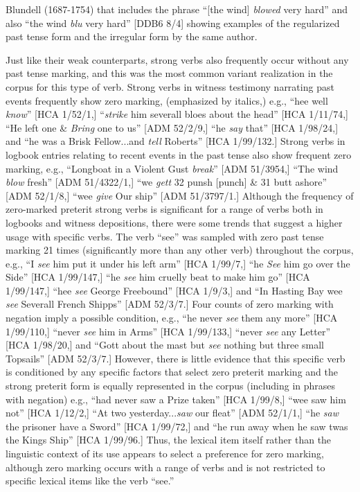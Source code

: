 \documentclass[12pt]{article}
\newenvironment{styleStandard}{\renewcommand\baselinestretch{1.0}\setlength\leftskip{0cm}\setlength\rightskip{0cm plus 1fil}\setlength\parindent{0cm}\setlength\parfillskip{0pt plus 1fil}\setlength\parskip{0in plus 1pt}\writerlistparindent\writerlistleftskip\leavevmode\normalfont\normalsize\writerlistlabel\ignorespaces}{\unskip\vspace{0in plus 1pt}\par}
\newcommand\writerlistleftskip{}
\newcommand\writerlistparindent{}
\newcommand\writerlistlabel{}
\begin{document}
\begin{styleStandard}
Blundell (1687-1754) that includes the phrase “[the wind] \textit{blowed} very hard” and also “the wind \textit{blu} very hard” [DDB6 8/4] showing examples of the regularized past tense form and the irregular form by the same author. 
\end{styleStandard}


\begin{styleStandard}
Just like their weak counterparts, strong verbs also frequently occur without any past tense marking, and this was the most common variant realization in the corpus for this type of verb. Strong verbs in witness testimony narrating past events frequently show zero marking, (emphasized by italics,) e.g., “hee well\textit{ know}” [HCA 1/52/1,] “\textit{strike} him severall bloes about the head” [HCA 1/11/74,] “He left one \&\textit{ Bring} one to us” [ADM 52/2/9,] “he \textit{say} that” [HCA 1/98/24,] and “he was a Brisk Fellow...and\textit{ tell} Roberts” [HCA 1/99/132.] Strong verbs in logbook entries relating to recent events in the past tense also show frequent zero marking, e.g., “Longboat in a Violent Gust \textit{break}” [ADM 51/3954,] “The wind \textit{blow} fresh” [ADM 51/4322/1,] “we \textit{gett} 32 punsh [punch] \& 31 butt ashore” [ADM 52/1/8,] “wee \textit{give} Our ship” [ADM 51/3797/1.] Although the frequency of zero-marked preterit strong verbs is significant for a range of verbs both in logbooks and witness depositions, there were some trends that suggest a higher usage with specific verbs. The verb “see” was sampled with zero past tense marking 21 times (significantly more than any other verb) throughout the corpus, e.g., “I \textit{see} him put it under his left arm” [HCA 1/99/7,] “he \textit{See} him go over the Side” [HCA 1/99/147,] “he\textit{ see} him cruelly beat to make him go” [HCA 1/99/147,] “hee \textit{see} George Freebound” [HCA 1/9/3,] and “In Hasting Bay wee \textit{see} Severall French Shipps” [ADM 52/3/7.] Four counts of zero marking with negation imply a possible condition, e.g., “he never \textit{see} them any more” [HCA 1/99/110,] “never\textit{ see} him in Arms” [HCA 1/99/133,] “never\textit{ see} any Letter” [HCA 1/98/20,] and “Gott about the mast but \textit{see} nothing but three small Topsails” [ADM 52/3/7.] However, there is little evidence that this specific verb is conditioned by any specific factors that select zero preterit marking and the strong preterit form is equally represented in the corpus (including in phrases with negation) e.g., “had never saw a Prize taken” [HCA 1/99/8,] “wee saw him not” [HCA 1/12/2,] “At two yesterday...\textit{saw} our fleat” [ADM 52/1/1,] “he \textit{saw} the prisoner have a Sword” [HCA 1/99/72,] and “he run away when he saw twas the Kings Ship” [HCA 1/99/96.] Thus, the lexical item itself rather than the linguistic context of its use appears to select a preference for zero marking, although zero marking occurs with a range of verbs and is not restricted to specific lexical items like the verb “see.”
\end{styleStandard}
\end{document}
